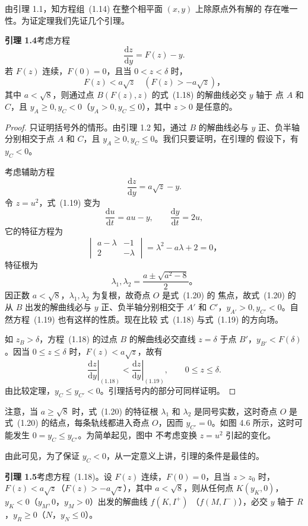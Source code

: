 由引理 1.1，知方程组~(1.14) 在整个相平面 $(x,y)$ 上除原点外有解的
存在唯一性。为证定理我们先证几个引理。

\noindent\textbf{引理 1.4}\quad 考虑方程
\[
  \dfrac{\mathrm{d}z}{\mathrm{d}y}=F(z)-y. \tag{1.18}
\]
若 $F(z)$ 连续，$F(0)=0$，且当 $0<z<\delta$ 时，
\[
  F(z)<a\sqrt z\quad(F(z)>-a\sqrt z)，
\]
其中 $a<\sqrt8$，则通过点 $B(F(z),z)$ 的式~(1.18) 的解曲线必交 $y$ 轴于
点 $A$ 和 $C$，且 $y_A\geq0,y_C<0$（$y_A>0,y_C\leq0$），其中 $z>0$ 是任意的。

\begin{proof}
只证明括号外的情形。由引理 1.2 知，通过 $B$ 的解曲线必与 $y$ 正、负半轴
分别相交于点 $A$ 和 $C$，且 $y_A\geq0,y_C\leq0$。我们只要证明，在引理的
假设下，有 $y_C<0$。

考虑辅助方程
\[
  \dfrac{\mathrm{d}z}{\mathrm{d}y}=a\sqrt z-y. \tag{1.19}
\]
令 $z=u^2$，式~(1.19) 变为
\[
  \dfrac{\mathrm{d}u}{\mathrm{d}t}=au-y,\qquad
  \dfrac{\mathrm{d}y}{\mathrm{d}t}=2u, \tag{1.20}
\]
它的特征方程为
\[
  \begin{vmatrix}a-\lambda&-1\\2&-\lambda\end{vmatrix}
  =\lambda^2-a\lambda+2=0，
\]
特征根为
\[
  \lambda_1,\lambda_2=\dfrac{a\pm\sqrt{a^2-8}}2。
\]
因正数 $a<\sqrt8$，$\lambda_1,\lambda_2$ 为复根，故奇点 $O$ 是式~(1.20) 的
焦点，故式~(1.20) 的从 $B$ 出发的解曲线必与 $y$ 正、负半轴分别相交于
$A'$ 和 $C'$，$y_{A'}>0,y_{C'}<0$。自然方程~(1.19) 也有这样的性质。现在比较
式~(1.18) 与式~(1.19) 的方向场。

如 $z_B>\delta$，方程~(1.18) 的过点 $B$ 的解曲线必交直线 $z=\delta$ 于点
$B'$，$y_{B'}<F(\delta)$。因当 $0\leq z\leq\delta$ 时，$F(z)<a\sqrt z$，故有
\[
  \left.\dfrac{\mathrm{d}z}{\mathrm{d}y}\right|_{(1.18)}
  <\left.\dfrac{\mathrm{d}z}{\mathrm{d}y}\right|_{(1.19)},
  \qquad0\leq z\leq\delta.
\]
由比较定理，$y_C\leq y_{C'}<0$。引理括号内的部分可同样证明。
\end{proof}

注意，当 $a\geq\sqrt8$ 时，式~(1.20) 的特征根 $\lambda_1$ 和 $\lambda_2$
是同号实数，这时奇点 $O$ 是式~(1.20) 的结点，每条轨线都进入奇点 $O$，因而
$y_{C'}=0$。如图 4.6 所示，这时可能发生 $0=y_C\leq y_{C'}$。为简单起见，图中
不考虑变换 $z=u^2$ 引起的变化。


由此可见，为了保证 $y_C<0$，从一定意义上讲，引理的条件是最佳的。

\noindent\textbf{引理 1.5}\quad 考虑方程~(1.18)。设 $F(z)$ 连续，$F(0)=0$，且当
$z>z_0$ 时，$F(z)<a\sqrt z$（$F(z)>-a\sqrt z$），其中 $a<\sqrt8$，则从任何点
$K(y_K,0)$，$y_K<0$（$y_M,0$，$y_M>0$）出发的解曲线 $f(K,I^+)$
（$f(M,I^-)$），必交 $y$ 轴于 $R$，$y_R\geq0$（$N$，$y_N\leq0$）。

